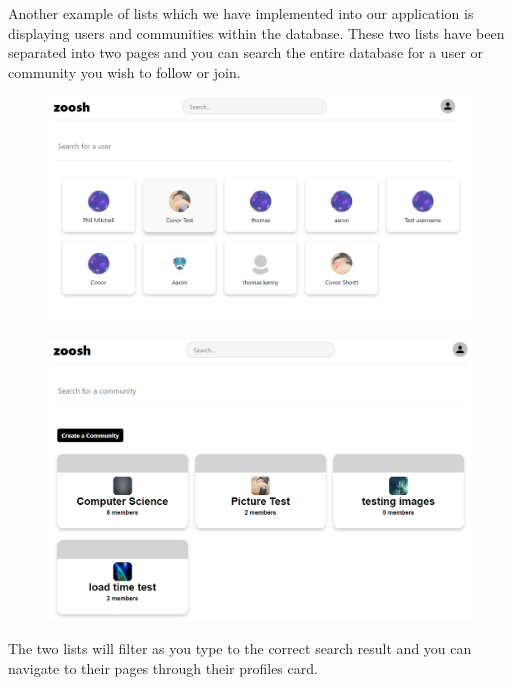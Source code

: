 \newline
Another example of lists which we have implemented into our application is displaying users and communities within the database. These two lists have been separated into two pages and you can search the entire database for a user or community you wish to follow or join.

\begin{figure}[H]
  \centering
  \includegraphics[scale=0.25]{img/users.png}
  \label{fig:Search Users within the website.}
\end{figure}

\begin{figure}[H]
  \centering
  \includegraphics[scale=0.25]{img/communities.PNG}
  \label{fig:Communities within the website.}
\end{figure}

\newline 
The two lists will filter as you type to the correct search result and you can navigate to their pages through their profiles card.


